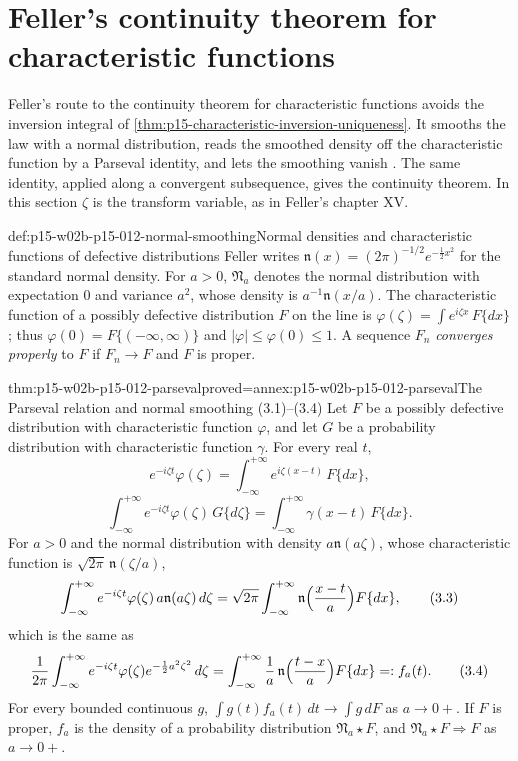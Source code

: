 \section{Feller's continuity theorem for characteristic functions}
\label{sec:p15-w02b-p15-012-cf-continuity}

Feller's route to the continuity theorem for characteristic functions avoids
the inversion integral of \cref{thm:p15-characteristic-inversion-uniqueness}.
It smooths the law with a normal distribution, reads the smoothed density off
the characteristic function by a Parseval identity, and lets the smoothing
vanish \cite[vol.~II, XV.3, pp.~507--509]{Feller1971ProbabilityII}. The same
identity, applied along a convergent subsequence, gives the continuity theorem.
In this section \(\zeta\) is the transform variable, as in Feller's chapter XV.

\begin{hbdefinition}{def:p15-w02b-p15-012-normal-smoothing}{Normal densities and characteristic functions of defective distributions}
Feller writes \(\mathfrak n(x)=(2\pi)^{-1/2}e^{-\frac12x^2}\) for the standard
normal density. For \(a>0\), \(\mathfrak N_a\) denotes the normal distribution
with expectation \(0\) and variance \(a^2\), whose density is
\(a^{-1}\mathfrak n(x/a)\). The characteristic function of a possibly
defective distribution \(F\) on the line is
\(\varphi(\zeta)=\int e^{i\zeta x}\,F\{dx\}\); thus
\(\varphi(0)=F\{(-\infty,\infty)\}\) and \(|\varphi|\leq\varphi(0)\leq1\).
A sequence \(F_n\) \emph{converges properly} to \(F\) if \(F_n\to F\) and
\(F\) is proper.
\end{hbdefinition}

\begin{hblemma}{thm:p15-w02b-p15-012-parseval}{proved=annex:p15-w02b-p15-012-parseval}{The Parseval relation and normal smoothing (3.1)--(3.4)}
Let \(F\) be a possibly defective distribution with characteristic function
\(\varphi\), and let \(G\) be a probability distribution with characteristic
function \(\gamma\). For every real \(t\),
\[
 e^{-i\zeta t}\varphi(\zeta)=\int_{-\infty}^{+\infty}e^{i\zeta(x-t)}\,F\{dx\},
 \tag{3.1}
\]
\[
 \int_{-\infty}^{+\infty}e^{-i\zeta t}\varphi(\zeta)\,G\{d\zeta\}
   =\int_{-\infty}^{+\infty}\gamma(x-t)\,F\{dx\}.
 \tag{3.2}
\]
For \(a>0\) and the normal distribution with density \(a\mathfrak n(a\zeta)\),
whose characteristic function is \(\sqrt{2\pi}\,\mathfrak n(\zeta/a)\),
\[
 \int_{-\infty}^{+\infty}e^{-i\zeta t}\varphi(\zeta)\,a\mathfrak n(a\zeta)\,d\zeta
   =\sqrt{2\pi}\int_{-\infty}^{+\infty}\mathfrak n\Bigl(\frac{x-t}a\Bigr)F\{dx\},
 \tag{3.3}
\]
which is the same as
\[
 \frac1{2\pi}\int_{-\infty}^{+\infty}e^{-i\zeta t}\varphi(\zeta)e^{-\frac12a^2\zeta^2}\,d\zeta
   =\int_{-\infty}^{+\infty}\frac1a\,\mathfrak n\Bigl(\frac{t-x}a\Bigr)F\{dx\}
   =:f_a(t).
 \tag{3.4}
\]
For every bounded continuous \(g\),
\(\int g(t)f_a(t)\,dt\to\int g\,dF\) as \(a\to0+\). If \(F\) is proper,
\(f_a\) is the density of a probability distribution
\(\mathfrak N_a\star F\), and \(\mathfrak N_a\star F\Rightarrow F\) as
\(a\to0+\).
\end{hblemma}

